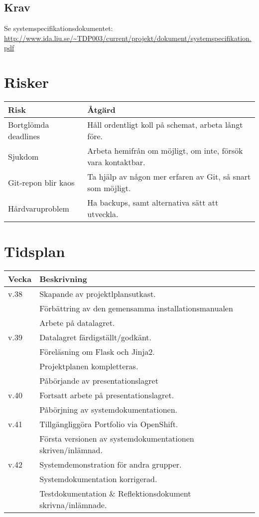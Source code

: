 \documentclass{TDP003mall}
\begin{document}
\subsection{Krav}
  Se systemspecifikationsdokumentet:\\
  \url{http://www.ida.liu.se/~TDP003/current/projekt/dokument/systemspecifikation.pdf}



\section{Risker}
  \begin{tabular}{ l|l }
    \hline
    Risk & Åtgärd \\
    \hline
    \hline
    Bortglömda deadlines & Håll ordentligt koll på schemat, arbeta långt före. \\
    \hline
	  Sjukdom & Arbeta hemifrån om möjligt, om inte, försök vara kontaktbar. \\
    \hline
	  Git-repon blir kaos & Ta hjälp av någon mer erfaren av Git, så snart som möjligt. \\
    \hline
	  Hårdvaruproblem & Ha backups, samt alternativa sätt att utveckla. \\
    \hline
  \end{tabular}

\section{Tidsplan}
  \begin{tabular}{ l|l }
    \hline
    Vecka & Beskrivning \\
    \hline
    \hline
	   v.38 & Skapande av projektlplansutkast.\\ & Förbättring av den gemensamma installationsmanualen \\ & Arbete på datalagret.\\
    \hline
	   v.39 & Datalagret färdigställt/godkänt.\\ & Föreläsning om Flask och Jinja2.\\ & Projektplanen kompletteras. \\ & Påbörjande av presentationslagret\\
    \hline
	   v.40 & Fortsatt arbete på presentationslagret.\\ & Påbörjning av systemdokumentationen.\\
    \hline
	   v.41 & Tillgängliggöra Portfolio via OpenShift.\\ & Första versionen av systemdokumentationen skriven/inlämnad. \\
    \hline
	   v.42 & Systemdemonstration för andra grupper.\\ & Systemdokumentation korrigerad. \\ & Testdokumentation \& Reflektionsdokument skrivna/inlämnade.\\
    \hline
  \end{tabular}
\end{document}
